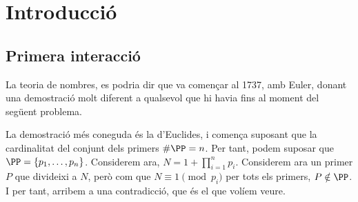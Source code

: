 \chapter{Introducció}
\section{Primera interacció}
La teoria de nombres, es podria dir que va començar al 1737, amb Euler, donant una demostració molt diferent a qualsevol que hi havia fins al moment del següent problema.
\begin{pf}
    La demostració més coneguda és la d'Euclides, i comença suposant que la cardinalitat del conjunt dels primers $\# \PP=n$. Per tant, podem suposar que $\PP=\{p_1,\dots,p_n\}$. Considerem ara, $N=1+\prod_{i=1}^np_i$. Considerem ara un primer $P$ que divideixi a $N$, però com que $N\equiv1\pmod{p_i}$ per tots els primers, $P\notin \PP$. I per tant, arribem a una contradicció, que és el que volíem veure.
\end{pf}

